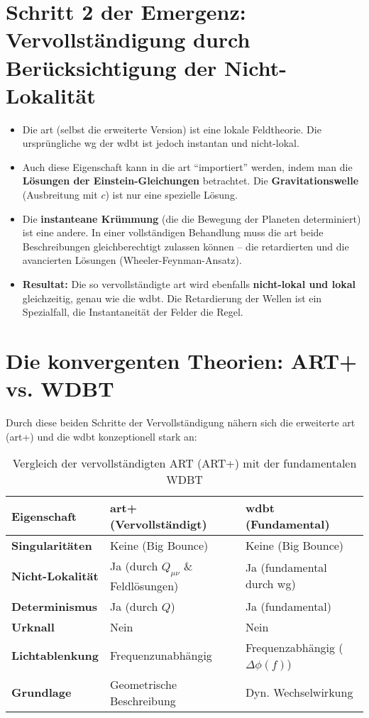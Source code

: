 \section{Schritt 2 der Emergenz: Vervollständigung durch Berücksichtigung der Nicht-Lokalität}

\begin{itemize}
    \item Die \gls{art} (selbst die erweiterte Version) ist eine lokale Feldtheorie. Die ursprüngliche \gls{wg} der \gls{wdbt} ist jedoch instantan und nicht-lokal.
    \item Auch diese Eigenschaft kann in die \gls{art} \enquote{importiert} werden, indem man die \textbf{Lösungen der Einstein-Gleichungen} betrachtet. Die \textbf{Gravitationswelle} (Ausbreitung mit $c$) ist nur eine spezielle Lösung.
    \item Die \textbf{instanteane Krümmung} (die die Bewegung der Planeten determiniert) ist eine andere. In einer vollständigen Behandlung muss die \gls{art} beide Beschreibungen gleichberechtigt zulassen können – die retardierten und die avancierten Lösungen (Wheeler-Feynman-Ansatz).
    \item \textbf{Resultat:} Die so vervollständigte \gls{art} wird ebenfalls \textbf{nicht-lokal und lokal} gleichzeitig, genau wie die \gls{wdbt}. Die Retardierung der Wellen ist ein Spezialfall, die Instantaneität der Felder die Regel.
\end{itemize}

\section{Die konvergenten Theorien: ART+ vs. WDBT}
Durch diese beiden Schritte der Vervollständigung nähern sich die erweiterte \gls{art} (\gls{art}+) und die \gls{wdbt} konzeptionell stark an:

\begin{table}[h]
\centering
\begin{tabular}{|p{}|p{}|p{}|}
\hline
\textbf{Eigenschaft} & \textbf{\gls{art}+ (Vervollständigt)} & \textbf{\gls{wdbt} (Fundamental)} \\
\hline
\textbf{Singularitäten} & Keine (Big Bounce) & Keine (Big Bounce) \\
\hline
\textbf{Nicht-Lokalität} & Ja (durch $Q_{\mu\nu}$ \& Feldlösungen) & Ja (fundamental durch \gls{wg}) \\
\hline
\textbf{Determinismus} & Ja (durch $Q$) & Ja (fundamental) \\
\hline
\textbf{Urknall} & Nein & Nein \\
\hline
\textbf{Lichtablenkung} & Frequenzunabhängig & Frequenzabhängig ($\Delta \phi(f)$) \\
\hline
\textbf{Grundlage} & Geometrische Beschreibung & Dyn. Wechselwirkung \\
\hline
\end{tabular}
\caption{Vergleich der vervollständigten ART (ART+) mit der fundamentalen WDBT}
\end{table}

